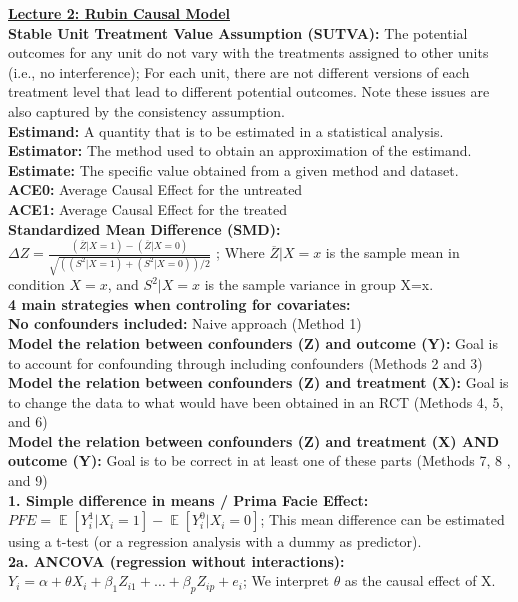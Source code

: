 \documentclass[a4paper,7pt,landscape]{extarticle}
\DeclareMathOperator*{\E}{\mathbb{E}} %
\begin{document}
\begin{multicols}{3}
\begin{boxA}
\underline{\textbf{Lecture 2: Rubin Causal Model}}\\
\textbf{Stable Unit Treatment Value Assumption (SUTVA):} The potential outcomes for any unit do not vary with the treatments assigned to other units (i.e., no interference); For each unit, there are not different versions of each treatment level that lead to different potential outcomes. Note these issues are also captured by the consistency assumption.\\
\textbf{Estimand:} A quantity that is to be estimated in a statistical analysis.\\
\textbf{Estimator:} The method used to obtain an approximation of the estimand.\\
\textbf{Estimate:} The specific value obtained from a given method and dataset.\\
\textbf{ACE0:} Average Causal Effect for the untreated\\
\textbf{ACE1:} Average Causal Effect for the treated\\
\textbf{Standardized Mean Difference (SMD):} \\$\Delta Z = \frac{(\overline{Z} | X = 1)-(\overline{Z} | X = 0)}{\sqrt{((S^2 | X = 1)+(S^2 | X = 0)) / 2}}$ ; Where $\overline{Z}|X=x$ is the sample mean in condition $X=x$, and $S^2|X=x$ is the sample variance in group X=x.\\
\textbf{4 main strategies when controling for covariates:}\\
\textbf{No confounders included:} Naive approach (Method 1)\\
\textbf{Model the relation between confounders (Z) and outcome (Y):} Goal is to account for confounding through including confounders (Methods 2 and 3)\\
\textbf{Model the relation between confounders (Z) and treatment (X):} Goal is to change the data to what would have been obtained in an RCT (Methods 4, 5, and 6)\\
\textbf{Model the relation between confounders (Z) and treatment (X) AND outcome (Y):} Goal is to be correct in at least one of these parts (Methods 7, 8 , and 9)\\
\textbf{1. Simple difference in means / Prima Facie Effect:} $PFE = \E [Y_i^1|X_i=1]- \E [Y_i^0|X_i=0]$; This mean difference can be estimated using a t-test (or a regression analysis with a dummy as predictor).\\
\textbf{2a. ANCOVA (regression without interactions):} $Y_i = \alpha+\theta X_i+ \beta_1 Z_{i1}+…+\beta_p Z_{ip}+e_i$; We interpret $\theta$ as the causal effect of X.\\

\end{boxA}
\end{multicols}
\end{document}
